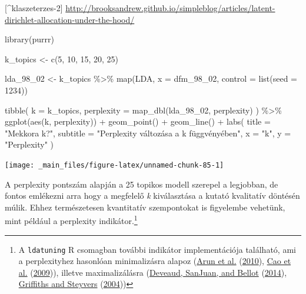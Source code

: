 \documentclass[
]{book}
\newenvironment{Shaded}{\begin{snugshade}}{\end{snugshade}}
\newcommand{\AttributeTok}[1]{\textcolor[rgb]{0.77,0.63,0.00}{#1}}
\newcommand{\DecValTok}[1]{\textcolor[rgb]{0.00,0.00,0.81}{#1}}
\newcommand{\FunctionTok}[1]{\textcolor[rgb]{0.00,0.00,0.00}{#1}}
\newcommand{\NormalTok}[1]{#1}
\newcommand{\OtherTok}[1]{\textcolor[rgb]{0.56,0.35,0.01}{#1}}
\newcommand{\SpecialCharTok}[1]{\textcolor[rgb]{0.00,0.00,0.00}{#1}}
\newcommand{\StringTok}[1]{\textcolor[rgb]{0.31,0.60,0.02}{#1}}
\begin{document}
{[}\^{}klaszeterzes-2{]}
\url{http://brooksandrew.github.io/simpleblog/articles/latent-dirichlet-allocation-under-the-hood/}

\begin{Shaded}
\begin{Highlighting}[]
\FunctionTok{library}\NormalTok{(purrr)}
\end{Highlighting}
\end{Shaded}

\begin{Shaded}
\begin{Highlighting}[]
\NormalTok{k\_topics }\OtherTok{\textless{}{-}} \FunctionTok{c}\NormalTok{(}\DecValTok{5}\NormalTok{, }\DecValTok{10}\NormalTok{, }\DecValTok{15}\NormalTok{, }\DecValTok{20}\NormalTok{, }\DecValTok{25}\NormalTok{)}

\NormalTok{lda\_98\_02 }\OtherTok{\textless{}{-}}\NormalTok{ k\_topics }\SpecialCharTok{\%\textgreater{}\%}
  \FunctionTok{map}\NormalTok{(LDA, }\AttributeTok{x =}\NormalTok{ dfm\_98\_02, }\AttributeTok{control =} \FunctionTok{list}\NormalTok{(}\AttributeTok{seed =} \DecValTok{1234}\NormalTok{))}


\FunctionTok{tibble}\NormalTok{(}
  \AttributeTok{k =}\NormalTok{ k\_topics,}
  \AttributeTok{perplexity =} \FunctionTok{map\_dbl}\NormalTok{(lda\_98\_02, perplexity)}
\NormalTok{) }\SpecialCharTok{\%\textgreater{}\%}
  \FunctionTok{ggplot}\NormalTok{(}\FunctionTok{aes}\NormalTok{(k, perplexity)) }\SpecialCharTok{+}
  \FunctionTok{geom\_point}\NormalTok{() }\SpecialCharTok{+}
  \FunctionTok{geom\_line}\NormalTok{() }\SpecialCharTok{+}
  \FunctionTok{labs}\NormalTok{(}
    \AttributeTok{title =} \StringTok{"Mekkora k?"}\NormalTok{,}
    \AttributeTok{subtitle =} \StringTok{"Perplexity változása a k függvényében"}\NormalTok{,}
    \AttributeTok{x =} \StringTok{"k"}\NormalTok{,}
    \AttributeTok{y =} \StringTok{"Perplexity"}
\NormalTok{  )}
\end{Highlighting}
\end{Shaded}

\begin{center}\texttt{[image: \_main\_files/figure-latex/unnamed-chunk-85-1]} \end{center}

A perplexity pontszám alapján a 25 topikos modell szerepel a legjobban,
de fontos emlékezni arra hogy a megfelelő \emph{k} kiválasztása a kutató
kvalitatív döntésén múlik. Ehhez természetesen kvantitatív szempontokat
is figyelembe vehetünk, mint például a perplexity indikátor.\footnote{A
  \texttt{ldatuning} R csomagban további indikátor implementációja
  található, ami a perplexityhez hasonlóan minimalizásra alapoz
  (\protect\hyperlink{ref-arun2010finding}{Arun et al.}
  (\protect\hyperlink{ref-arun2010finding}{2010}),
  \protect\hyperlink{ref-cao2009density}{Cao et al.}
  (\protect\hyperlink{ref-cao2009density}{2009})), illetve
  maximalizálásra (\protect\hyperlink{ref-deveaud2014accurate}{Deveaud,
  SanJuan, and Bellot}
  (\protect\hyperlink{ref-deveaud2014accurate}{2014}),
  \protect\hyperlink{ref-griffiths2004}{Griffiths and Steyvers}
  (\protect\hyperlink{ref-griffiths2004}{2004}))}
\end{document}
